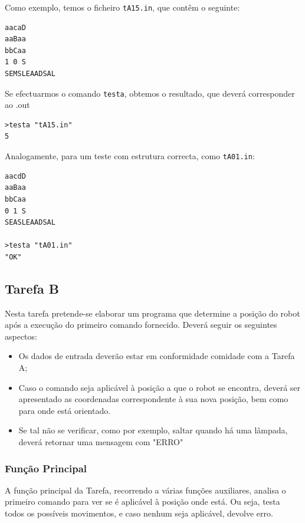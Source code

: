 \documentclass[a4paper]{article}
\begin{document}
Como exemplo, temos o ficheiro \verb|tA15.in|, que contêm o seguinte:
\begin{verbatim}
aacaD
aaBaa
bbCaa
1 0 S
SEMSLEAADSAL
\end{verbatim}

Se efectuarmos o comando \verb|testa|, obtemos o resultado, que deverá corresponder ao .out
\begin{verbatim}
>testa "tA15.in"
5
\end{verbatim}

Analogamente, para um teste com estrutura correcta, como \verb|tA01.in|:

\begin{verbatim}
aacdD
aaBaa
bbCaa
0 1 S
SEASLEAADSAL

>testa "tA01.in"
"OK"
\end{verbatim}
\break
\subsection{Tarefa B}

Nesta tarefa pretende-se elaborar um programa que determine a posição do robot após a execução do primeiro comando fornecido. Deverá seguir os seguintes aspectos:

\begin {itemize}
\item Os dados de entrada deverão estar em conformidade comidade com a Tarefa A;

\item Caso o comando seja aplicável à posição a que o robot se encontra, deverá ser apresentado as coordenadas correspondente à sua nova posição, bem como para onde está orientado.

\item Se tal não se verificar, como por exemplo, saltar quando há uma lâmpada, deverá retornar uma mensagem com "ERRO"

\end{itemize}
\subsubsection{Função Principal}
A função principal da Tarefa, recorrendo a várias funções auxiliares, analisa o primeiro comando para ver se é aplicável à posição onde está. Ou seja, testa todos os possíveis movimentos, e caso nenhum seja aplicável, devolve erro.
\end{document}
